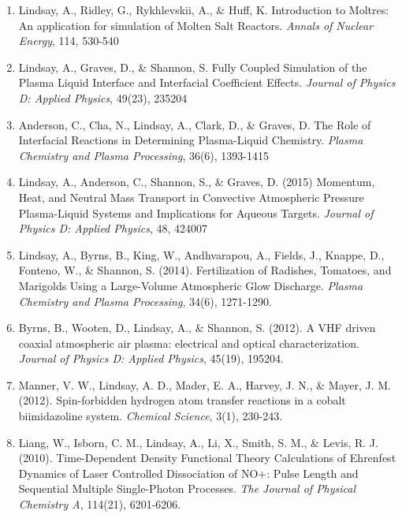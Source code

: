 \begin{enumerate}
  \item Lindsay, A., Ridley, G., Rykhlevskii, A., \& Huff, K. Introduction to Moltres: An application for simulation of Molten Salt Reactors. \textit{Annals of Nuclear Energy}, 114, 530-540
  \item Lindsay, A., Graves, D., \& Shannon, S. Fully Coupled Simulation
  of the Plasma Liquid Interface and Interfacial Coefficient
  Effects. \textit{Journal of Physics D: Applied Physics}, 49(23), 235204
  \item Anderson, C., Cha, N., Lindsay, A., Clark, D., \& Graves, D. The
  Role of Interfacial Reactions in Determining Plasma-Liquid
  Chemistry. \textit{Plasma Chemistry and Plasma Processing}, 36(6), 1393-1415
  \item Lindsay, A., Anderson, C., Shannon, S., \& Graves, D. (2015) Momentum, Heat, and Neutral Mass Transport in Convective Atmospheric Pressure Plasma-Liquid Systems and Implications for Aqueous Targets. \textit{Journal of Physics D: Applied Physics}, 48, 424007
  \item Lindsay, A., Byrns, B., King, W., Andhvarapou, A., Fields, J., Knappe, D., Fonteno, W., \& Shannon, S. (2014). Fertilization of Radishes, Tomatoes, and Marigolds Using a Large-Volume Atmospheric Glow Discharge. \textit{Plasma Chemistry and Plasma Processing}, 34(6), 1271-1290.
  \item Byrns, B., Wooten, D., Lindsay, A., \& Shannon, S. (2012). A VHF driven coaxial atmospheric air plasma: electrical and optical characterization. \textit{Journal of Physics D: Applied Physics}, 45(19), 195204.
  \item Manner, V. W., Lindsay, A. D., Mader, E. A., Harvey, J. N., \& Mayer, J. M. (2012). Spin-forbidden hydrogen atom transfer reactions in a cobalt biimidazoline system. \textit{Chemical Science}, 3(1), 230-243.
  \item Liang, W., Isborn, C. M., Lindsay, A., Li, X., Smith, S. M., \& Levis,
    R. J. (2010). Time-Dependent Density Functional Theory Calculations of
    Ehrenfest Dynamics of Laser Controlled Dissociation of NO+: Pulse Length and
    Sequential Multiple Single-Photon Processes. \textit{The Journal of Physical
      Chemistry A}, 114(21), 6201-6206.
\end{enumerate}
